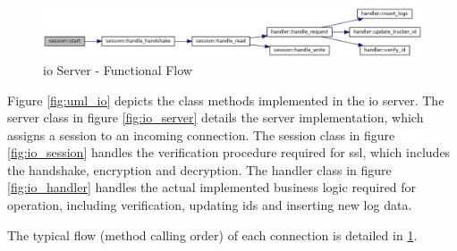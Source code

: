 \begin{figure}
\centering
\includegraphics[width=6in]{io_flow.png}
\caption{\ac{io} Server - Functional Flow}
\label{fig:io_flow}
\end{figure}

Figure \ref{fig:uml_io} depicts the class methods implemented in the \ac{io} server.
The server class in figure \ref{fig:io_server} details the server implementation, which assigns a session to an incoming connection.
The session class in figure \ref{fig:io_session} handles the verification procedure required for \ac{ssl}, which includes the handshake, encryption and decryption.
The handler class in figure \ref{fig:io_handler} handles the actual implemented business logic required for operation, including verification, updating \ac{id}s and inserting new log data.

The typical flow (method calling order) of each connection is detailed in \ref{fig:io_flow}.
